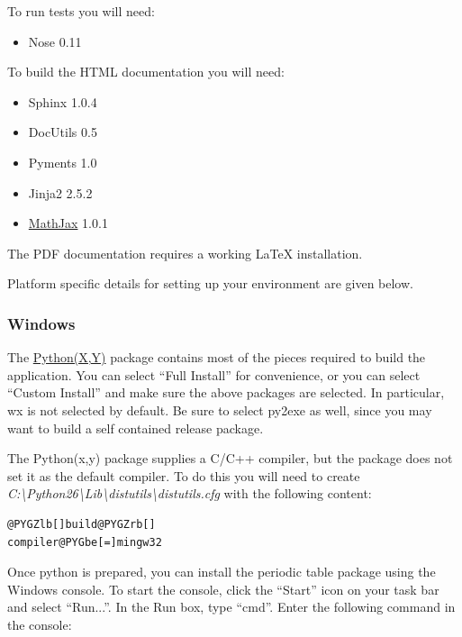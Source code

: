 \documentclass[letterpaper,10pt,english]{sphinxmanual}
\begin{document}
To run tests you will need:
\begin{itemize}
\item {} 
Nose 0.11

\end{itemize}

To build the HTML documentation you will need:
\begin{itemize}
\item {} 
Sphinx 1.0.4

\item {} 
DocUtils 0.5

\item {} 
Pyments 1.0

\item {} 
Jinja2 2.5.2

\item {} 
\href{http://www.mathjax.org/download/}{MathJax} 1.0.1

\end{itemize}

The PDF documentation requires a working LaTeX installation.

Platform specific details for setting up your environment are given below.


\subsubsection{Windows}
\label{getting_started/install:windows}
The \href{http://code.google.com/p/pythonxy/}{Python(X,Y)} package contains
most of the pieces required to build the application.  You can select
``Full Install'' for convenience, or you can select ``Custom Install'' and make
sure the above packages are selected.  In particular, wx is not selected
by default.  Be sure to select py2exe as well, since you may want to
build a self contained release package.

The Python(x,y) package supplies a C/C++ compiler, but the package does
not set it as the default compiler.  To do this you will need to create
\emph{C:\textbackslash{}Python26\textbackslash{}Lib\textbackslash{}distutils\textbackslash{}distutils.cfg} with the following content:

\begin{Verbatim}[commandchars=@\[\]]
@PYGZlb[]build@PYGZrb[]
compiler@PYGbe[=]mingw32
\end{Verbatim}

Once python is prepared, you can install the periodic table package using
the Windows console.  To start the console, click the ``Start'' icon on your
task bar and select ``Run...''.  In the Run box, type ``cmd''.  Enter the
following command in the console:
\end{document}
